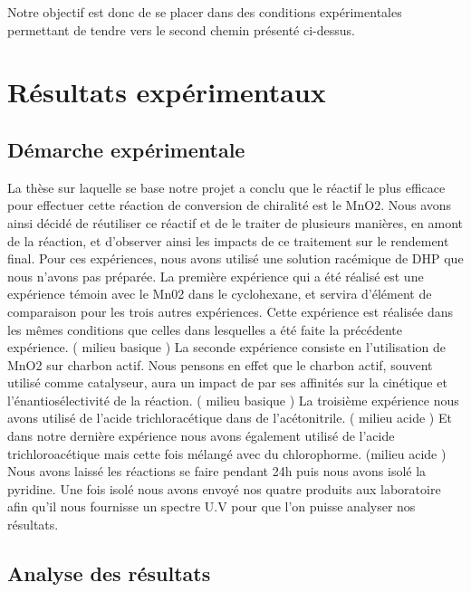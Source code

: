\documentclass{article}
\begin{document}
Notre objectif est donc de se placer dans des conditions expérimentales permettant de tendre vers le second chemin présenté ci-dessus.



\newpage


\section{Résultats expérimentaux}



\subsection{Démarche expérimentale}

La thèse sur laquelle se base notre projet a conclu que le réactif le plus efficace pour effectuer cette réaction de conversion de chiralité est le MnO2. Nous avons ainsi décidé de réutiliser ce réactif et de le traiter de plusieurs manières, en amont de la réaction, et d’observer ainsi les impacts de ce traitement sur le rendement final.
Pour ces expériences, nous avons utilisé une solution racémique de DHP que nous n’avons pas préparée.
\medbreak
La première expérience qui a été réalisé est une expérience témoin avec le Mn02 dans le cyclohexane, et servira d’élément de comparaison pour les trois autres expériences. Cette expérience est réalisée dans les mêmes conditions que celles dans lesquelles a été faite la précédente expérience. ( milieu basique )
 \medbreak
La seconde expérience consiste en l’utilisation de MnO2 sur charbon actif. Nous pensons en effet que le charbon actif, souvent utilisé comme catalyseur, aura un impact de par ses affinités sur la cinétique et l'énantiosélectivité de la réaction. ( milieu basique )
\medbreak
La troisième expérience nous avons utilisé de l’acide trichloracétique dans de l’acétonitrile. ( milieu acide )
Et dans notre dernière expérience nous avons également utilisé de l’acide trichloroacétique mais cette fois mélangé avec du chlorophorme. (milieu acide )
\medbreak
Nous avons laissé les réactions se faire pendant 24h puis nous avons isolé la pyridine.
Une fois isolé nous avons envoyé nos quatre produits aux laboratoire afin qu’il nous fournisse un spectre U.V pour que l’on puisse analyser nos résultats.



\subsection{Analyse des résultats}
\end{document}
